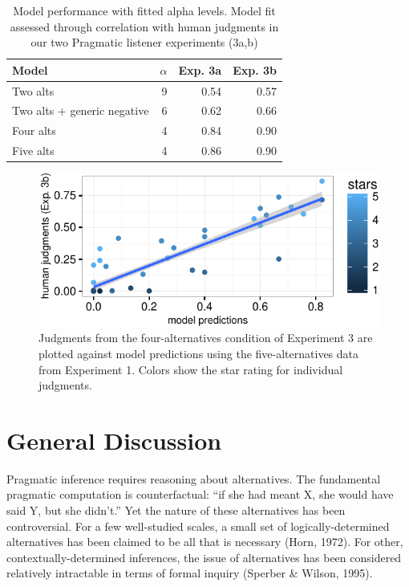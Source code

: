 \documentclass[10pt, letterpaper]{article}
\newenvironment{CodeChunk}{}{}
\begin{document}
\begin{table}[ht]
\centering
\begin{tabular}{lrrr}
  \hline
Model & $\alpha$ & Exp. 3a & Exp. 3b \\ 
  \hline
Two alts &   9 & 0.54 & 0.57 \\ 
  Two alts + generic negative  &   6 & 0.62 & 0.66 \\ 
  Four alts &   4 & 0.84 & 0.90 \\ 
  Five alts &   4 & 0.86 & 0.90 \\ 
   \hline
\end{tabular}
\caption{Model performance with fitted alpha levels. Model fit assessed through correlation with human judgments in our two Pragmatic listener experiments (3a,b)} 
\end{table}

\begin{CodeChunk}
\begin{figure}[t]
\includegraphics{figs/fiveAltsScatter-1} \caption[Judgments from the four-alternatives condition of Experiment 3 are plotted against model predictions using the five-alternatives data from Experiment 1]{Judgments from the four-alternatives condition of Experiment 3 are plotted against model predictions using the five-alternatives data from Experiment 1. Colors show the star rating for individual judgments.}\label{fig:fiveAltsScatter}
\end{figure}
\end{CodeChunk}

\section{General Discussion}\label{general-discussion}

Pragmatic inference requires reasoning about alternatives. The
fundamental pragmatic computation is counterfactual: ``if she had meant
X, she would have said Y, but she didn't.'' Yet the nature of these
alternatives has been controversial. For a few well-studied scales, a
small set of logically-determined alternatives has been claimed to be
all that is necessary (Horn, 1972). For other, contextually-determined
inferences, the issue of alternatives has been considered relatively
intractable in terms of formal inquiry (Sperber \& Wilson, 1995).
\end{document}
